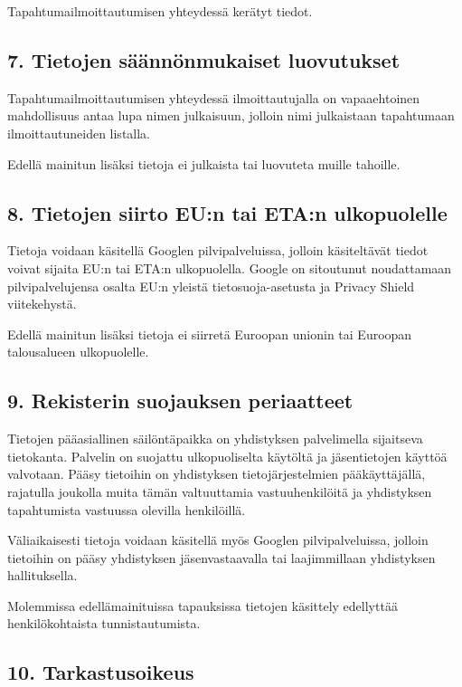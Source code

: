 \documentclass[finnish]{tktltiki}
\begin{document}
Tapahtumailmoittautumisen yhteydessä kerätyt tiedot.

\subsection*{7. Tietojen säännönmukaiset luovutukset}

Tapahtumailmoittautumisen yhteydessä ilmoittautujalla on vapaaehtoinen mahdollisuus antaa lupa nimen julkaisuun, jolloin nimi julkaistaan tapahtumaan ilmoittautuneiden listalla.

Edellä mainitun lisäksi tietoja ei julkaista tai luovuteta muille tahoille.

\subsection*{8. Tietojen siirto EU:n tai ETA:n ulkopuolelle}

Tietoja voidaan käsitellä Googlen pilvipalveluissa, jolloin käsiteltävät tiedot voivat sijaita EU:n tai ETA:n ulkopuolella. Google on sitoutunut noudattamaan pilvipalvelujensa osalta EU:n yleistä tietosuoja-asetusta ja Privacy Shield viitekehystä.

Edellä mainitun lisäksi tietoja ei siirretä Euroopan unionin tai Euroopan talousalueen ulkopuolelle.

\subsection*{9. Rekisterin suojauksen periaatteet}

Tietojen pääasiallinen säilöntäpaikka on yhdistyksen palvelimella sijaitseva tietokanta. Palvelin on suojattu ulkopuoliselta käytöltä ja jäsentietojen käyttöä valvotaan. Pääsy tietoihin on yhdistyksen tietojärjestelmien pääkäyttäjällä, rajatulla joukolla muita tämän valtuuttamia vastuuhenkilöitä ja yhdistyksen tapahtumista vastuussa olevilla henkilöillä.

Väliaikaisesti tietoja voidaan käsitellä myös Googlen pilvipalveluissa, jolloin tietoihin on pääsy yhdistyksen jäsenvastaavalla tai laajimmillaan yhdistyksen hallituksella.

Molemmissa edellämainituissa tapauksissa tietojen käsittely edellyttää henkilökohtaista tunnistautumista.

\subsection*{10. Tarkastusoikeus}
\end{document}
